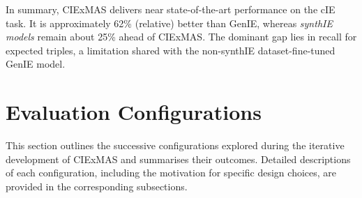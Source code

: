 \documentclass[a4paper,oneside,bibliography=totoc]{scrbook}
\begin{document}
In summary, CIExMAS delivers near state-of-the-art performance on the \ac{cIE} task. It is approximately 62\% (relative) better than GenIE, whereas \textit{synthIE models} remain about 25\% ahead of CIExMAS. The dominant gap lies in recall for expected triples, a limitation shared with the non-synthIE dataset-fine-tuned GenIE model.

\section{Evaluation Configurations}
\label{sec:evaluation_configurations}

This section outlines the successive configurations explored during the iterative development of CIExMAS and summarises their outcomes. Detailed descriptions of each configuration, including the motivation for specific design choices, are provided in the corresponding subsections.
\end{document}
